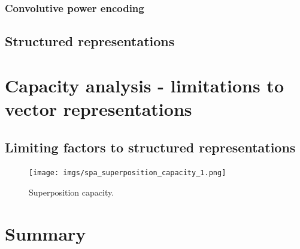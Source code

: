 \subsubsection{Convolutive power encoding}

\subsection{Structured representations}%
\label{subsec:structured_representations}

\section{Capacity analysis - limitations to vector representations}%
\label{sec:capacity_analysis_limitations_to_vector_representations}

\subsection{Limiting factors to structured representations}%
\label{subsec:limiting_factors_to_structured_representations}


\begin{figure}[t]
	\centering
	\texttt{[image: imgs/spa\_superposition\_capacity\_1.png]}
	\caption{Superposition capacity.}
	\label{fig:spa_superposition_capacity}
\end{figure}

\section{Summary}%
\label{sec:vector_representations_automotive_summary}


